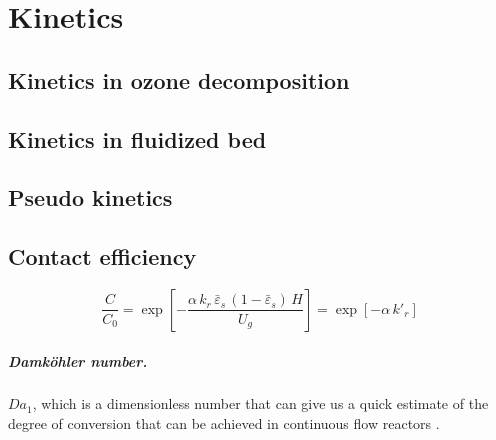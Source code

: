 \chapter{Kinetics}
\section{Kinetics in ozone decomposition}

\section{Kinetics in fluidized bed}

\section{Pseudo kinetics}

\section{Contact efficiency}

\begin{equation}
    \frac{C}{C_0} 
    = \exp\left[ 
        -\frac{\alpha\,k_r\,\bar{\varepsilon}_s\, (1-\bar{\varepsilon}_s)\,H}{U_g} 
        \right]
    = \exp\left[ -\alpha\,k'_r \right]
\end{equation}


\paragraph{Damköhler number.} 
$Da_1$, which is a dimensionless number that can give us a quick estimate of the degree of conversion that can be achieved in continuous flow reactors \citep{fogler2016element}.